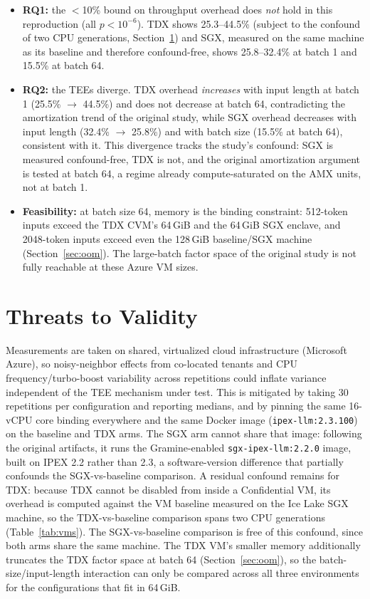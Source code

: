 \documentclass[sigconf]{acmart}
\begin{document}
\begin{itemize}
  \item \textbf{RQ1:} the $<$10\% bound on throughput overhead does \emph{not} hold in
  this reproduction (all $p < 10^{-6}$). TDX shows 25.3--44.5\% (subject to the confound
  of two CPU generations, Section~\ref{sec:threats}) and SGX, measured on the same
  machine as its baseline and therefore confound-free, shows 25.8--32.4\% at batch 1
  and 15.5\% at batch 64.
  \item \textbf{RQ2:} the TEEs diverge. TDX overhead \emph{increases} with input length
  at batch 1 (25.5\% $\rightarrow$ 44.5\%) and does not decrease at batch 64,
  contradicting the amortization trend of the original study, while SGX overhead
  decreases with input length (32.4\% $\rightarrow$ 25.8\%) and with batch size (15.5\%
  at batch 64), consistent with it. This divergence tracks the study's confound: SGX is
  measured confound-free, TDX is not, and the original amortization argument is tested
  at batch 64, a regime already compute-saturated on the AMX units, not at batch 1.
  \item \textbf{Feasibility:} at batch size 64, memory is the binding constraint:
  512-token inputs exceed the TDX CVM's 64\,GiB and the 64\,GiB SGX enclave, and
  2048-token inputs exceed even the 128\,GiB baseline/SGX machine
  (Section~\ref{sec:oom}). The large-batch factor space of the original study is not
  fully reachable at these Azure VM sizes.
\end{itemize}

\section{Threats to Validity}
\label{sec:threats}

Measurements are taken on shared, virtualized cloud infrastructure (Microsoft Azure),
so noisy-neighbor effects from co-located tenants and CPU frequency/turbo-boost
variability across repetitions could inflate variance independent of the TEE mechanism
under test. This is mitigated by taking 30 repetitions per configuration and reporting
medians, and by pinning the same 16-vCPU core binding everywhere and the same Docker
image (\texttt{ipex-llm:2.3.100}) on the baseline and TDX arms. The SGX arm cannot
share that image: following the original artifacts, it runs the Gramine-enabled
\texttt{sgx-ipex-llm:2.2.0} image, built on IPEX 2.2 rather than 2.3, a
software-version difference that partially confounds the SGX-vs-baseline comparison. A
residual confound remains for TDX: because TDX cannot be disabled from inside a
Confidential VM, its overhead is computed against the VM baseline measured on the Ice
Lake SGX machine, so the TDX-vs-baseline comparison spans two CPU generations
(Table~\ref{tab:vms}). The SGX-vs-baseline comparison is free of this confound, since
both arms share the same machine. The TDX VM's smaller memory additionally truncates
the TDX factor space at batch 64 (Section~\ref{sec:oom}), so the
batch-size/input-length interaction can only be compared across all three environments
for the configurations that fit in 64\,GiB.
\end{document}

